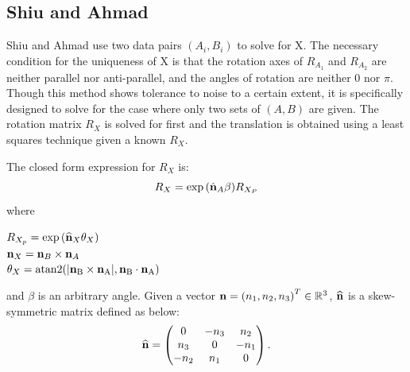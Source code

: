 \documentclass[twocolumn,10pt]{asme2ej}
\newcommand{\nn}{{\bf n}}
\newcommand{\ttt}{{\bf t}}
\begin{document}

\subsection{Shiu and Ahmad }
Shiu and Ahmad \cite{shiu1987finding,shiu1989calibration} use two data pairs $(A_{i}, B_{i})$ to solve for X. The necessary condition for the uniqueness of X is that the rotation axes of $R_{A_1}$ and $R_{A_2}$ are neither parallel nor anti-parallel, and the angles of rotation are neither 0 nor $\pi$. Though this method shows tolerance to noise to a certain extent, it is specifically designed to solve for the case where only two sets of $(A, B)$ are given. 
The rotation matrix $R_{X}$ is solved for first and the translation is obtained using a least squares technique given a known $R_{X}$.

The closed form expression for $R_{X}$ is:
\begin{equation}
R_{X} = \exp{(\hat{\nn}_{A}\beta)}R_{X_{P}}
\label{RotationCheng}
\end{equation}
where 
\begin{center}
$R_{X_{p}} =  \exp{(\widehat{\nn}_{X}\theta_{X})}$\\
$\nn_{X} = \nn_{B} \times \nn_{A}$\\
$\theta_{X} = \rm atan2(|\nn_{B} \times \nn_{A}|,\nn_{B} \cdot \nn_{A})$\\
\end{center}
and $\beta$ is an arbitrary angle. Given a vector $\nn = \left( n_{1}, n_{2}, n_{3} \right)^{T} \in \mathbb{R}^{3}$, $\widehat{\nn}$ is a skew-symmetric matrix defined as below:\\
\begin{equation}
\widehat{\nn}
=
\begin{pmatrix}
0 & -n_{3} & n_{2} \\
n_{3} & 0 & -n_{1} \\
-n_{2} & n_{1} & 0
\end{pmatrix}.
\end{equation}
\end{document}
